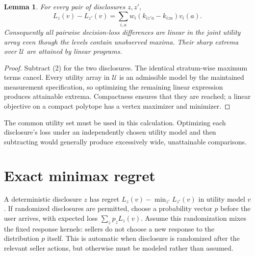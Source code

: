 \documentclass[11pt]{article}
\newtheorem{lemma}[theorem]{Lemma}
\theoremstyle{definition}
\begin{document}
\begin{lemma}
For every pair of disclosures $z,z'$,
\[
 L_z(v)-L_{z'}(v)
 =\sum_{i,a}w_i(k_{iz'a}-k_{iza})v_i(a).                 \tag{3}
\]
Consequently all pairwise decision-loss differences are linear in the
joint utility array even though the levels contain unobserved maxima.
Their sharp extrema over $\mathcal U$ are attained by linear programs.
\end{lemma}
\begin{proof}
Subtract (2) for the two disclosures. The identical stratum-wise maximum
terms cancel. Every utility array in $\mathcal U$ is an admissible model
by the maintained measurement specification, so optimizing the remaining
linear expression produces attainable extrema. Compactness ensures that
they are reached; a linear objective on a compact polytope has a vertex
maximizer and minimizer.
\end{proof}
The common utility set must be used in this calculation. Optimizing each
disclosure's loss under an independently chosen utility model and then
subtracting would generally produce excessively wide, unattainable
comparisons.

\section*{Exact minimax regret}
A deterministic disclosure $z$ has regret
$L_z(v)-\min_{z'}L_{z'}(v)$ in utility model $v$. If randomized
disclosures are permitted, choose a probability vector $p$ before the
user arrives, with expected loss $\sum_zp_zL_z(v)$. Assume this
randomization mixes the fixed response kernels: sellers do not choose a
new response to the distribution $p$ itself. This is automatic when
disclosure is randomized after the relevant seller actions, but otherwise
must be modeled rather than assumed.
\end{document}
